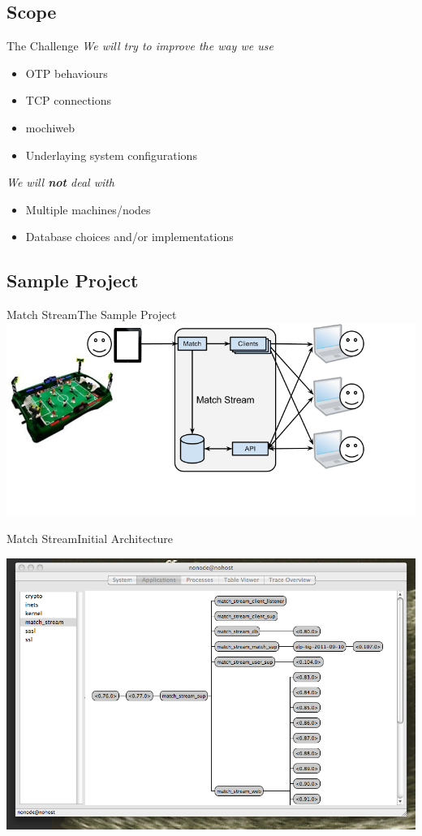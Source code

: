 \documentclass[utf8]{beamer}
\begin{document}
\subsection{Scope}
\begin{frame}{The Challenge}
	\emph{We will try to improve the way we use}
	\begin{itemize}
		\item OTP behaviours
		\item TCP connections
		\item mochiweb
		\item Underlaying system configurations
	\end{itemize}
	\pause
	\emph{We will \textbf{not} deal with}
	\begin{itemize}
		\item Multiple machines/nodes
		\item Database choices and/or implementations
	\end{itemize}
\end{frame}

\subsection{Sample Project}
\begin{frame}[t]{Match Stream}{The Sample Project}
	\includegraphics[width=\textwidth]{img/MatchStream.png}
\end{frame}
\begin{frame}{Match Stream}{Initial Architecture}
	\begin{center}
		\includegraphics[height=.75\textheight]{img/running.png}
	\end{center}
\end{frame}
\end{document}
